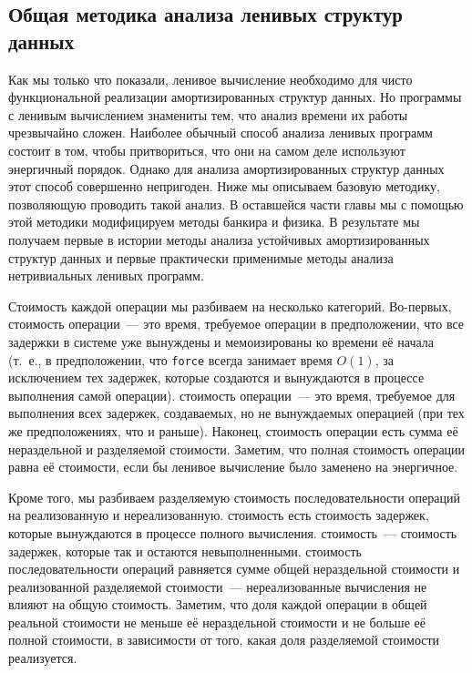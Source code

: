 \subsection{Общая методика анализа ленивых структур данных}
\label{sc:6.2.2}

Как мы только что показали, ленивое вычисление необходимо для чисто
функциональной реализации амортизированных структур данных. Но
программы с ленивым вычислением знамениты тем, что анализ времени их
работы чрезвычайно сложен. Наиболее обычный способ анализа ленивых
программ состоит в том, чтобы притвориться, что они на самом деле
используют энергичный порядок. Однако для анализа амортизированных
структур данных этот способ совершенно непригоден. Ниже мы описываем
базовую методику, позволяющую проводить такой анализ. В оставшейся
части главы мы с помощью этой методики модифицируем методы банкира и
физика. В результате мы получаем первые в истории методы анализа
устойчивых амортизированных структур данных и первые практически применимые
методы анализа нетривиальных ленивых программ.

Стоимость каждой операции мы разбиваем на несколько категорий. Во-первых,
 стоимость операции~--- это время,
требуемое операции в предположении, что все задержки в системе уже
вынуждены и мемоизированы ко времени её начала (т.~е., в
предположении, что \lstinline!force! всегда занимает время $O(1)$, за
исключением тех задержек, которые создаются и вынуждаются в процессе
выполнения самой операции).  стоимость
операции~--- это время, требуемое для выполнения всех задержек,
создаваемых, но не вынуждаемых операцией (при тех же предположениях,
что и раньше). Наконец,  стоимость операции
есть сумма её нераздельной и разделяемой стоимости. Заметим, что
полная стоимость операции равна её стоимости, если бы ленивое
вычисление было заменено на энергичное.

Кроме того, мы разбиваем разделяемую стоимость последовательности
операций на реализованную и
нереализованную.  стоимость есть
стоимость задержек, которые вынуждаются в процессе полного
вычисления.  стоимость~--- стоимость
задержек, которые так и остаются невыполненными.  стоимость последовательности операций
равняется сумме общей нераздельной стоимости и реализованной
разделяемой стоимости~--- нереализованные вычисления не влияют на
общую стоимость. Заметим, что доля каждой операции в общей реальной
стоимости не меньше её нераздельной стоимости и не больше её полной
стоимости, в зависимости от того, какая доля разделяемой стоимости
реализуется.

